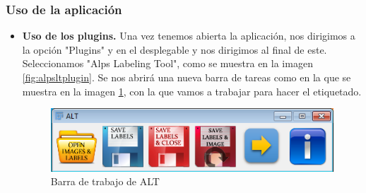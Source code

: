 \subsubsection{Uso de la aplicación}
\begin{itemize}
	\item \textbf{Uso de los plugins.} Una vez tenemos abierta la aplicación, nos dirigimos a la opción "Plugins" y en el desplegable y nos dirigimos al final de este. Seleccionamos "Alps Labeling Tool", como se muestra en la imagen \ref{fig:alpsltplugin}.
	Se nos abrirá una nueva barra de tareas como en la que se muestra en la imagen \ref{fig:alt}, con la que vamos a trabajar para hacer el etiquetado.
	\begin{figure}
		\centering
		\includegraphics[width=0.7\linewidth]{img/alt}
		\caption{Barra de trabajo de ALT}
		\label{fig:alt}
	\end{figure}
	

\end{itemize}
